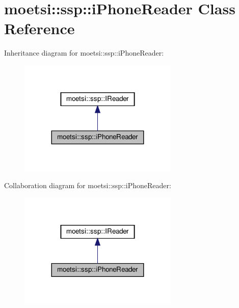 \hypertarget{classmoetsi_1_1ssp_1_1iPhoneReader}{}\section{moetsi\+:\+:ssp\+:\+:i\+Phone\+Reader Class Reference}
\label{classmoetsi_1_1ssp_1_1iPhoneReader}


Inheritance diagram for moetsi\+:\+:ssp\+:\+:i\+Phone\+Reader\+:
\nopagebreak
\begin{figure}[H]
\begin{center}
\leavevmode
\includegraphics[width=215pt]{classmoetsi_1_1ssp_1_1iPhoneReader__inherit__graph}
\end{center}
\end{figure}


Collaboration diagram for moetsi\+:\+:ssp\+:\+:i\+Phone\+Reader\+:
\nopagebreak
\begin{figure}[H]
\begin{center}
\leavevmode
\includegraphics[width=215pt]{classmoetsi_1_1ssp_1_1iPhoneReader__coll__graph}
\end{center}
\end{figure}
